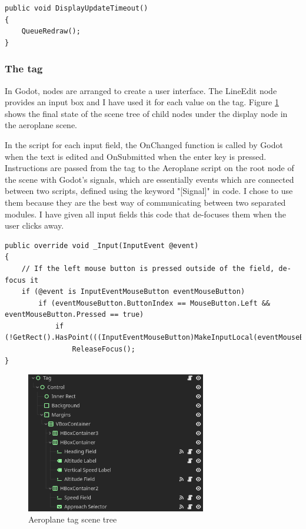 \documentclass{article}
\begin{document}
\lstset{style=csharp}
\begin{lstlisting}[caption=Updating the leader line on a timer]
public void DisplayUpdateTimeout()
{
    QueueRedraw();
}
\end{lstlisting}

\subsubsection{The tag}\label{thetag}
In Godot, nodes are arranged to create a user interface.
The LineEdit node provides an input box and I have used it for each value on the tag.
Figure \ref{fig:tagtree} shows the final state of the scene tree of child nodes under the display node in the aeroplane scene.

In the script for each input field, the OnChanged function is called by Godot when the text is edited and OnSubmitted when the enter key is pressed.
Instructions are passed from the tag to the Aeroplane script on the root node of the scene with Godot's signals, which are essentially events which are connected between two scripts, defined using the keyword "[Signal]" in code.
I chose to use them because they are the best way of communicating between two separated modules.
I have given all input fields this code that de-focuses them when the user clicks away.
\lstset{style=csharp}
\begin{lstlisting}[caption=Input field de-focus event]
public override void _Input(InputEvent @event)
{
    // If the left mouse button is pressed outside of the field, de-focus it
    if (@event is InputEventMouseButton eventMouseButton)
        if (eventMouseButton.ButtonIndex == MouseButton.Left && eventMouseButton.Pressed == true)
            if (!GetRect().HasPoint(((InputEventMouseButton)MakeInputLocal(eventMouseButton)).Position))
                ReleaseFocus();
}
\end{lstlisting}
\begin{figure}[H]
\centering
\includegraphics[width=0.7\textwidth]{screenshots/tagtree.png}
\caption{\label{fig:tagtree}Aeroplane tag scene tree}
\end{figure}
\end{document}
